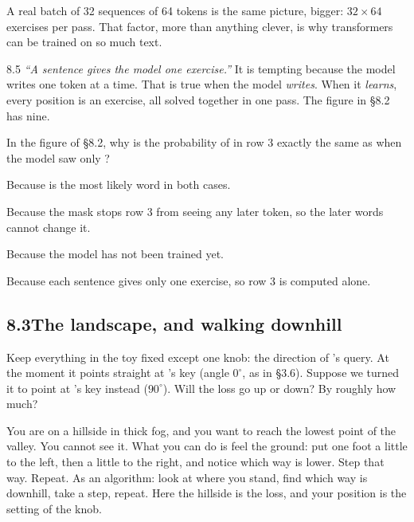 A real batch of 32 sequences of 64 tokens is the same picture, bigger: $32\times64$ exercises per pass. That factor, more than
anything clever, is why transformers can be trained on so much text.

\begin{wrongidea}{8.5}
\emph{``A sentence gives the model one exercise.''} It is tempting because the model writes one token at a
time. That is true when the model \emph{writes}. When it \emph{learns},
every position is an exercise, all solved together in one pass. The figure in \S8.2 has nine.
\end{wrongidea}

\begin{checkq}
In the figure of \S8.2, why is the probability of  in row 3 exactly the same as when the model saw only
?
\begin{options}
\item Because  is the most likely word in both cases.
\item Because the mask stops row 3 from seeing any later token, so the later words cannot change it.
\item Because the model has not been trained yet.
\item Because each sentence gives only one exercise, so row 3 is computed alone.
\end{options}
\end{checkq}


\subsection*{8.3\quad The landscape, and walking downhill}

\Predict Keep everything in the toy fixed except one knob: the direction of 's query. At the
moment it points straight at 's key (angle $0^\circ$, as in \S3.6). Suppose we turned it to point
at 's key instead ($90^\circ$). Will the loss go up or down? By roughly how much?

\Picture You are on a hillside in thick fog, and you want to reach the lowest point of the valley. You cannot
see it. What you can do is feel the ground: put one foot a little to the left, then a little to the right,
and notice which way is lower. Step that way. Repeat. As an algorithm: look at where you stand, find which way is downhill, take a
step, repeat. Here the hillside is the loss, and your position is the
setting of the knob.

